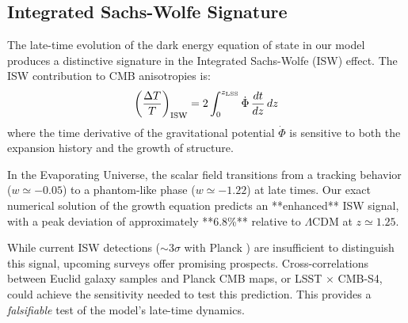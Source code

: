 

\subsection{Integrated Sachs-Wolfe Signature}
\label{sec:isw}

The late-time evolution of the dark energy equation of state in our model 
produces a distinctive signature in the Integrated Sachs-Wolfe (ISW) effect. 
The ISW contribution to CMB anisotropies is:
%
\begin{equation}
\left(\frac{\Delta T}{T}\right)_{\rm ISW} = 2\int_0^{z_{\rm LSS}} 
\dot{\Phi} \, \frac{dt}{dz} \, dz
\end{equation}
%
where the time derivative of the gravitational potential $\dot{\Phi}$ 
is sensitive to both the expansion history and the growth of structure.

In the Evaporating Universe, the scalar field transitions from a tracking behavior 
($w \simeq -0.05$) to a phantom-like phase ($w \simeq -1.22$) at late times. 
Our exact numerical solution of the growth equation predicts an **enhanced** ISW signal, 
with a peak deviation of approximately **6.8\%** relative to $\Lambda$CDM at $z \simeq 1.25$.

While current ISW detections ($\sim 3\sigma$ with Planck \cite{Planck2018}) 
are insufficient to distinguish this signal, upcoming surveys offer promising 
prospects. Cross-correlations between Euclid galaxy samples and Planck CMB maps, 
or LSST $\times$ CMB-S4, could achieve the sensitivity needed to test this 
prediction. This provides a \textit{falsifiable} test of the model's 
late-time dynamics.
